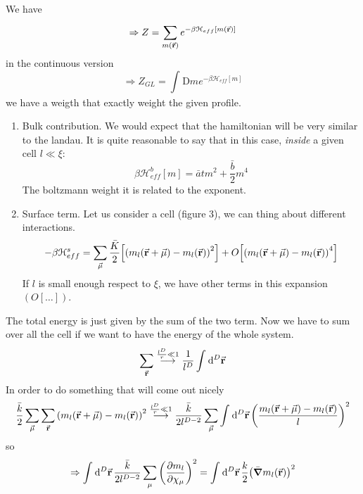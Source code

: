 \documentclass[../main/main.tex]{subfiles}
\begin{document}
We have
\begin{equation}
  \Rightarrow Z = \sum_{m(\va{r})}^{} e^{-\beta \mathcal{H}_{eff} [m(\va{r})]}
\end{equation}
in the continuous version
\begin{equation}
  \Rightarrow Z_{GL} = \int_{}^{} \text{D}  m e^{-\beta \mathcal{H}_{eff}[m]}
\end{equation}
we have a weigth that exactly weight the given profile.
\begin{enumerate}
\item Bulk contribution. We would expect that the hamiltonian will be very similar to the landau. It is quite reasonable to say that in this case, \emph{inside}  a given cell \( l \ll \xi  \):
\begin{equation}
  \beta \mathcal{H}_{eff}^b [m] = \bar{a} t m^2 + \frac{\bar{b} }{2} m^4
\end{equation}
The boltzmann weight it is related to the exponent.
\item Surface term. Let us consider a cell (figure 3), we can thing about different interactions.
\begin{equation}
  - \beta \mathcal{H}_{eff}^s =   \sum_{\va{\mu }}^{}  \frac{\bar{K} }{2}\qty[ \qty(m_l (\va{r}+\va{\mu }) - m_l(\va{r}))^2] + O \qty[ \qty(m_l (\va{r}+\va{\mu }) - m_l(\va{r}))^4 ]
 \end{equation}
 If \( l \) is small enough respect to \( \xi  \), we have other terms in this expansion \( (O[\dots]) \).
\end{enumerate}
The total energy is just given by the sum of the two term. Now we have to sum over all the cell if we want to have the energy of the whole system.
\begin{equation}
  \sum_{\va{r}}^{}  \overset{\frac{l^D}{r} \ll 1}{\longrightarrow}   \frac{1}{l^D} \int_{}^{} \dd[D]{\va{r}}
\end{equation}
In order to do something that will come out nicely
\begin{equation}
\frac{\bar{k} }{2} \sum_{\va{\mu }}^{} \sum_{\va{r}}^{}   \qty(m_l (\va{r}+\va{\mu }) - m_l(\va{r}))^2 \overset{\frac{l^D}{r} \ll 1}{\longrightarrow} \frac{\bar{k} }{2l^{D-2}} \sum_{\va{\mu }}^{} \int_{}^{} \dd[D]{\va{r}} \qty(\frac{m_l (\va{r}+\va{\mu }) - m_l(\va{r})}{l})^2
\end{equation}
so
\begin{equation}
  \Rightarrow \int_{}^{} \dd[D]{\va{r}}  \frac{\bar{k} }{2l^{D-2}} \sum_{\mu }^{} \qty(\pdv{m_l}{\chi _ \mu } )^2 = \int_{}^{} \dd[D]{\va{r}} \frac{k}{2} \qty(\bar{\grad } m_l (\va{r}) )^2
\end{equation}
\end{document}

